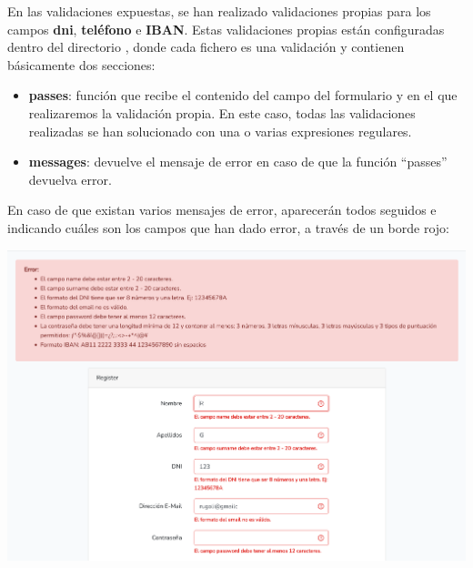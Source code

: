 \documentclass{\ClassPath/viu-tfm-template}
\begin{document}

En las validaciones expuestas, se han realizado validaciones propias para los campos \textbf{dni}, \textbf{teléfono} e \textbf{IBAN}. Estas validaciones propias están configuradas dentro del directorio , donde cada fichero es una validación y contienen básicamente dos secciones:

\begin{itemize}
    \item \textbf{passes}: función que recibe el contenido del campo del formulario y en el que realizaremos la validación propia. En este caso, todas las validaciones realizadas se han solucionado con una o varias expresiones regulares.

    \item \textbf{messages}: devuelve el mensaje de error en caso de que la función “passes” devuelva error.
\end{itemize}

En caso de que existan varios mensajes de error, aparecerán todos seguidos e indicando cuáles son los campos que han dado error, a través de un borde rojo:

\begin{center}
    \includegraphics[frame,width=0.8\linewidth]{img/errores.png}
\end{center}
\end{document}
